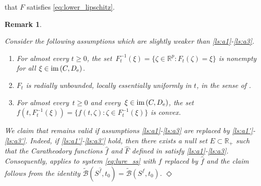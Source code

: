 \documentclass[a4paper,11pt]{article}
\newcommand{\R}{\mathbb R}
\newcommand{\sB}{{\mathcal B}}
\numberwithin{equation}{section}
\numberwithin{figure}{section}
\numberwithin{table}{section}
\newtheorem{remark}[theorem]{Remark}
\begin{document}
that $F$ satisfies \eqref{eq:lower_lipschitz}.
%
\begin{remark}\label{rem:a.e.'}
\begin{rm}
Consider the following assumptions which are slightly weaker than \ref{ls:a1}-\ref{ls:a3}.
\begin{enumerate}[label = {\bfseries (B\arabic*)}, ref = {\rm (B\arabic*)}]
%
\item \label{ls:a1'} For almost every $t\geq 0$, the set~$F_t^{-1}(\xi)=\{\zeta\in\R^p:F_t(\zeta)=\xi\}$ is nonempty for all $\xi\in{\rm im}\,(C,D_{\rm e})$.
%
\item \label{ls:a2'} $F_t$ is radially unbounded, locally essentially uniformly in $t$, in the sense of .
%
\item \label{ls:a3'} For almost every~$t\geq 0$ and every~$\xi\in {\rm im}\,(C,D_{\rm e})$, the set~$f(t,F_t^{-1}(\xi))=\{f(t,\zeta):\zeta\in F_t^{-1}(\xi)\}$ is convex.
\end{enumerate}
We claim that  remains valid if assumptions \ref{ls:a1}-\ref{ls:a3} are replaced by \ref{ls:a1'}-\ref{ls:a3'}. Indeed, if \ref{ls:a1'}-\ref{ls:a3'} hold, then
there exists a null set $E\subset\R_+$ such that the  Caratheodory functions $\hat f$ and $\hat F$ defined in  satisfy \ref{ls:a1}-\ref{ls:a3}. Consequently,  applies to system \eqref{eq:lure_ss} with $f$ replaced by $\hat f$
and the claim follows from the identity  $\tilde\sB(S^{\hat f},t_0)=
\tilde\sB(S^f,t_0)$.
\hfill$\Diamond$
\end{rm}
\end{remark}
\end{document}
